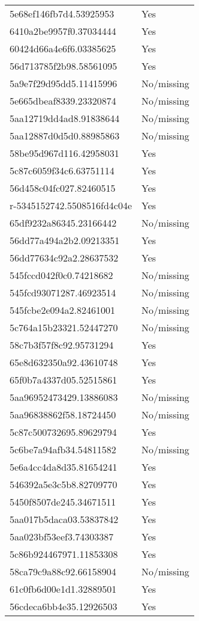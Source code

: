 \begin{tabular}{ll}
5e68ef146fb7d4.53925953 & Yes \\
6410a2be9957f0.37034444 & Yes \\
60424d66a4e6f6.03385625 & Yes \\
56d713785f2b98.58561095 & Yes \\
5a9e7f29d95dd5.11415996 & No/missing \\
5e665dbeaf8339.23320874 & No/missing \\
5aa12719dd4ad8.91838644 & No/missing \\
5aa12887d0d5d0.88985863 & No/missing \\
58be95d967d116.42958031 & Yes \\
5c87c6059f34c6.63751114 & Yes \\
56d458c04fc027.82460515 & Yes \\
r-5345152742.5508516fd4c04e & Yes \\
65df9232a86345.23166442 & No/missing \\
56dd77a494a2b2.09213351 & Yes \\
56dd77634c92a2.28637532 & Yes \\
545fccd042f0c0.74218682 & No/missing \\
545fcd93071287.46923514 & No/missing \\
545fcbe2e094a2.82461001 & No/missing \\
5c764a15b23321.52447270 & No/missing \\
58c7b3f57f8c92.95731294 & Yes \\
65e8d632350a92.43610748 & Yes \\
65f0b7a4337d05.52515861 & Yes \\
5aa96952473429.13886083 & No/missing \\
5aa96838862f58.18724450 & No/missing \\
5c87c500732695.89629794 & Yes \\
5c6be7a94afb34.54811582 & No/missing \\
5e6a4cc4da8d35.81654241 & Yes \\
546392a5e3c5b8.82709770 & Yes \\
5450f8507de245.34671511 & Yes \\
5aa017b5daca03.53837842 & Yes \\
5aa023bf53eef3.74303387 & Yes \\
5c86b924467971.11853308 & Yes \\
58ca79c9a88c92.66158904 & No/missing \\
61c0fb6d00e1d1.32889501 & Yes \\
56cdeca6bb4e35.12926503 & Yes \\

\end{tabular}
